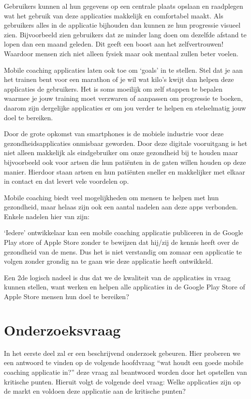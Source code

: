 Gebruikers kunnen al hun gegevens op een centrale plaats opslaan en raadplegen wat het gebruik van deze applicaties makkelijk en comfortabel maakt. Als gebruikers alles in de applicatie bijhouden dan kunnen ze hun progressie visueel zien. Bijvoorbeeld zien gebruikers dat ze minder lang doen om dezelfde afstand te lopen dan een maand geleden. Dit geeft een boost aan het zelfvertrouwen! Waardoor mensen zich niet alleen fysiek maar ook mentaal zullen beter voelen.

Mobile coaching applicaties laten ook toe om ‘goals’ in te stellen. Stel dat je aan het trainen bent voor een marathon of je wil wat kilo’s kwijt dan helpen deze applicaties de gebruikers. Het is soms moeilijk om zelf stappen te bepalen waarmee je jouw training moet verzwaren of aanpassen om progressie te boeken, daarom zijn dergelijke applicaties er om jou verder te helpen en stelselmatig jouw doel te bereiken.

Door de grote opkomst van smartphones is de mobiele industrie voor deze gezondheidsapplicaties onmisbaar geworden. Door deze digitale vooruitgang is het niet alleen makkelijk als eindgebruiker om onze gezondheid bij te houden maar bijvoorbeeld ook voor artsen die hun patiënten in de gaten willen houden op deze manier. Hierdoor staan artsen en hun patiënten sneller en makkelijker met elkaar in contact en dat levert vele voordelen op.

Mobile coaching biedt veel mogelijkheden om mensen te helpen met hun gezondheid, maar helaas zijn ook een aantal nadelen aan deze apps verbonden.  Enkele nadelen hier van zijn:

‘Iedere’ ontwikkelaar kan een mobile coaching applicatie publiceren in de Google Play store of Apple Store zonder te bewijzen dat hij/zij de kennis heeft over de gezondheid van de mens. Dus het is niet verstandig om zomaar een applicatie te volgen zonder grondig na te gaan wie deze applicatie heeft ontwikkeld.

Een 2de logisch nadeel is dus dat we de kwaliteit van de applicaties in vraag kunnen stellen, want werken en helpen alle applicaties in de Google Play Store of Apple Store mensen hun doel te bereiken?

\newpage

\section{Onderzoeksvraag}
\label{sec:onderzoeksvraag}

In het eerste deel zal er een beschrijvend onderzoek gebeuren. Hier proberen we een antwoord te vinden op de volgende hoofdvraag “wat houdt een goede mobile coaching applicatie in?” deze vraag zal beantwoord worden door het opstellen van kritische punten. Hieruit volgt de volgende deel vraag: Welke applicaties zijn op de markt en voldoen deze applicatie aan de kritische punten? 

